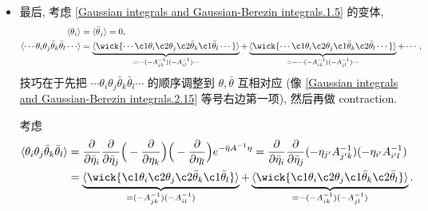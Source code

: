 \begin{itemize}
	\item 最后, 考虑 \eqref{Gaussian integrals and Gaussian-Berezin integrals.1.5} 的变体,
	\begin{align}
		\braket{\theta_i} &= \braket{\bar{\theta}_j} = 0, \\
		\braket{\cdots \theta_i \theta_j \bar{\theta}_k \bar{\theta}_l \cdots} &= \underbrace{\braket{\wick{
			\cdots \c1 \theta_i \c2 \theta_j \c2 {\bar{\theta}}_k \c1 {\bar{\theta}}_l \cdots
		}}}_{= \cdots (- A^{- 1}_{j k}) (- A^{- 1}_{i l}) \cdots} + \underbrace{\braket{\wick{
			\cdots \c1 \theta_i \c2 \theta_j \c1 {\bar{\theta}}_k \c2 {\bar{\theta}}_l \cdots
		}}}_{= - \cdots (- A^{- 1}_{i k}) (- A^{- 1}_{j l}) \cdots} + \cdots, \label{Gaussian integrals and Gaussian-Berezin integrals.2.15}
	\end{align}
	技巧在于先把 $\cdots \theta_i \theta_j \bar{\theta}_k \bar{\theta}_l \cdots$ 的顺序调整到 $\theta, \bar{\theta}$ 互相对应 (像 \eqref{Gaussian integrals and Gaussian-Berezin integrals.2.15} 等号右边第一项), 然后再做 contraction.
	
	\begin{tcolorbox}[title=calculation:]
		考虑
		\begin{align}
			\braket{\theta_i \theta_j \bar{\theta}_k \bar{\theta}_l} &= \frac{\partial}{\partial \bar{\eta}_i} \frac{\partial}{\partial \bar{\eta}_j} \Big( - \frac{\partial}{\partial \eta_k} \Big) \Big( - \frac{\partial}{\partial \eta_l} \Big) e^{- \bar{\eta} A^{- 1} \eta} = \frac{\partial}{\partial \bar{\eta}_i} \frac{\partial}{\partial \bar{\eta}_j} (- \eta_{j'} A^{- 1}_{j' k}) (- \eta_{i'} A^{- 1}_{i' l}) \notag \\
			&= \underbrace{\braket{\wick{
						\c1 \theta_i \c2 \theta_j \c2 {\bar{\theta}}_k \c1 {\bar{\theta}}_l
			}}}_{= (- A^{- 1}_{j k}) (- A^{- 1}_{i l})} + \underbrace{\braket{\wick{
						\c1 \theta_i \c2 \theta_j \c1 {\bar{\theta}}_k \c2 {\bar{\theta}}_l
			}}}_{= - (- A^{- 1}_{i k}) (- A^{- 1}_{j l})}.
		\end{align}
	\end{tcolorbox}
\end{itemize}
